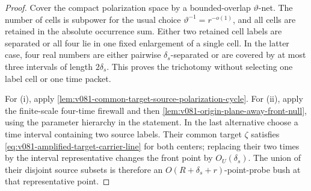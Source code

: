 \documentclass[10pt]{article}
\begin{document}
\begin{proof}
Cover the compact polarization space by a bounded-overlap
\(\vartheta\)-net.  The number of cells is subpower for the usual choice
\(\vartheta^{-1}=r^{-o(1)}\), and all cells are retained in the absolute occurrence sum.  Either
two retained cell labels are separated or all four lie in one fixed enlargement of a single cell.
In the latter case, four real numbers are either pairwise \(\delta_s\)-separated or are covered by
at most three intervals of length \(2\delta_s\).  This proves the trichotomy without selecting one
label cell or one time packet.

For \textnormal{(i)}, apply
\cref{lem:v081-common-target-source-polarization-cycle}.  For \textnormal{(ii)}, apply the
finite-scale four-time firewall and then
\cref{lem:v081-origin-plane-away-front-null}, using the parameter hierarchy in the statement.  In
the last alternative choose a time interval containing two
source labels.  Their common target \(\zeta\) satisfies
\eqref{eq:v081-amplified-target-carrier-line} for both centers; replacing their two times by the
interval representative changes the front point by \(O_U(\delta_s)\).  The union of their
disjoint source subsets is therefore an
\(O(R+\delta_s+r)\)-point-probe bush at that representative point.
\end{proof}
\end{document}
